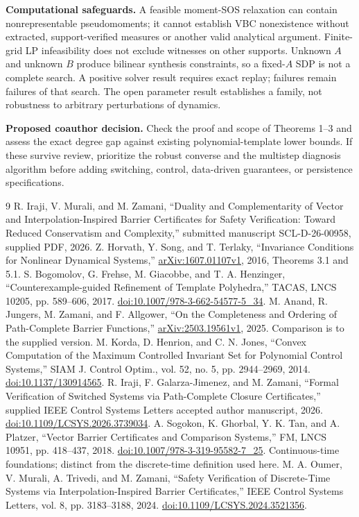 \documentclass[10pt,letterpaper]{article}
\begin{document}
\textbf{Computational safeguards.} A feasible moment-SOS relaxation can contain nonrepresentable pseudomoments; it cannot establish VBC nonexistence without extracted, support-verified measures or another valid analytical argument. Finite-grid LP infeasibility does not exclude witnesses on other supports. Unknown $A$ and unknown $B$ produce bilinear synthesis constraints, so a fixed-$A$ SDP is not a complete search. A positive solver result requires exact replay; failures remain failures of that search. The open parameter result establishes a family, not robustness to arbitrary perturbations of dynamics.

\textbf{Proposed coauthor decision.} Check the proof and scope of Theorems 1--3 and assess the exact degree gap against existing polynomial-template lower bounds. If these survive review, prioritize the robust converse and the multistep diagnosis algorithm before adding switching, control, data-driven guarantees, or persistence specifications.

\newpage
\begin{thebibliography}{9}\small
{} R. Iraji, V. Murali, and M. Zamani, ``Duality and Complementarity of Vector and Interpolation-Inspired Barrier Certificates for Safety Verification: Toward Reduced Conservatism and Complexity,'' submitted manuscript SCL-D-26-00958, supplied PDF, 2026.
 Z. Horvath, Y. Song, and T. Terlaky, ``Invariance Conditions for Nonlinear Dynamical Systems,'' \href{https://arxiv.org/abs/1607.01107}{arXiv:1607.01107v1}, 2016, Theorems 3.1 and 5.1.
 S. Bogomolov, G. Frehse, M. Giacobbe, and T. A. Henzinger, ``Counterexample-guided Refinement of Template Polyhedra,'' TACAS, LNCS 10205, pp. 589--606, 2017. \href{https://doi.org/10.1007/978-3-662-54577-5_34}{doi:10.1007/978-3-662-54577-5\_34}.
 M. Anand, R. Jungers, M. Zamani, and F. Allgower, ``On the Completeness and Ordering of Path-Complete Barrier Functions,'' \href{https://arxiv.org/abs/2503.19561}{arXiv:2503.19561v1}, 2025. Comparison is to the supplied version.
 M. Korda, D. Henrion, and C. N. Jones, ``Convex Computation of the Maximum Controlled Invariant Set for Polynomial Control Systems,'' SIAM J. Control Optim., vol. 52, no. 5, pp. 2944--2969, 2014. \href{https://doi.org/10.1137/130914565}{doi:10.1137/130914565}.
 R. Iraji, F. Galarza-Jimenez, and M. Zamani, ``Formal Verification of Switched Systems via Path-Complete Closure Certificates,'' supplied IEEE Control Systems Letters accepted author manuscript, 2026. \href{https://doi.org/10.1109/LCSYS.2026.3739034}{doi:10.1109/LCSYS.2026.3739034}.
 A. Sogokon, K. Ghorbal, Y. K. Tan, and A. Platzer, ``Vector Barrier Certificates and Comparison Systems,'' FM, LNCS 10951, pp. 418--437, 2018. \href{https://doi.org/10.1007/978-3-319-95582-7_25}{doi:10.1007/978-3-319-95582-7\_25}. Continuous-time foundations; distinct from the discrete-time definition used here.
 M. A. Oumer, V. Murali, A. Trivedi, and M. Zamani, ``Safety Verification of Discrete-Time Systems via Interpolation-Inspired Barrier Certificates,'' IEEE Control Systems Letters, vol. 8, pp. 3183--3188, 2024. \href{https://doi.org/10.1109/LCSYS.2024.3521356}{doi:10.1109/LCSYS.2024.3521356}.
\end{thebibliography}
\end{document}
